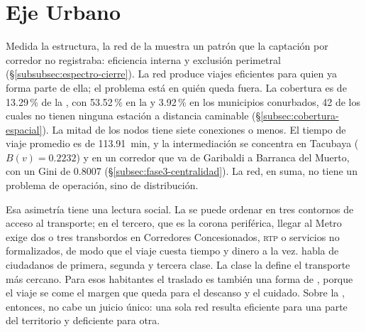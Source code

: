 \section{Eje Urbano}
\label{sec:conclusiones-urbano}

Medida la estructura, la red de la \zmvm{} muestra un patrón que la captación
por corredor no registraba: eficiencia interna y exclusión perimetral
(§\ref{subsubsec:espectro-cierre}). La red produce viajes eficientes para quien
ya forma parte de ella; el problema está en quién queda fuera. La cobertura es
de 13.29\,\% de la \zmvm{}, con 53.52\,\% en la \cdmx{} y 3.92\,\% en los
municipios conurbados, 42 de los cuales no tienen ninguna estación a distancia
caminable (§\ref{subsec:cobertura-espacial}). La mitad de los nodos tiene siete
conexiones o menos. El tiempo de viaje promedio es de 113.91~min, y la
intermediación se concentra en Tacubaya ($B(v) = 0.2232$) y en un corredor que
va de Garibaldi a Barranca del Muerto, con un Gini de 0.8007
(§\ref{subsec:fase3-centralidad}). La red, en suma, no tiene un problema de
operación, sino de distribución.

Esa asimetría tiene una lectura social. La \zmvm{} se puede ordenar en tres
contornos de acceso al transporte; en el tercero, que es la corona periférica,
llegar al Metro exige dos o tres transbordos en Corredores Concesionados,
\textsc{rtp} o servicios no formalizados, de modo que el viaje cuesta tiempo y
dinero a la vez. \citet{rendon2009ciudadanos} habla de ciudadanos de primera,
segunda y tercera clase. La clase la define el transporte más cercano. Para
esos habitantes el traslado es también una forma de 
\citep{gaceta_cuidados_2026}, porque el viaje se come el margen que queda para
el descanso y el cuidado. Sobre la \zmvm{}, entonces, no cabe un juicio único:
una sola red resulta eficiente para una parte del territorio y deficiente para
otra.

